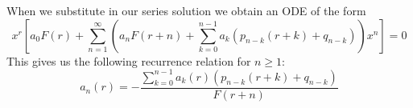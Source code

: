 \documentclass[12pt, a4paper, oneside, openright, titlepage]{book}
\begin{document}



\begin{thm}
        When we substitute in our series solution we obtain an ODE of the form \begin{equation}
                x^r\left[a_0F(r)+\sum\limits_{n=1}^{\infty}\left(a_nF(r+n)+\sum\limits_{k=0}^{n-1}a_k(p_{n-k}(r+k)+q_{n-k})\right)x^n\right] = 0
        \end{equation}
        This gives us the following recurrence relation for $n \geq 1$: \begin{equation}
                a_n(r) = -\frac{\sum\limits_{k=0}^{n-1}a_k(r)(p_{n-k}(r+k)+q_{n-k})}{F(r+n)}
        \end{equation}
\end{thm}


\end{document}
